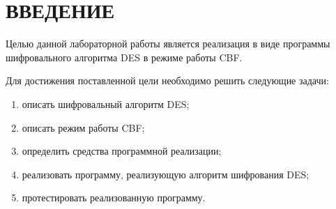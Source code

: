 \chapter*{ВВЕДЕНИЕ}

Целью данной лабораторной работы является реализация в виде программы шифровального алгоритма DES в режиме работы CBF.

Для достижения поставленной цели необходимо решить следующие задачи:
\begin{enumerate}
	\item описать шифровальный алгоритм DES;
	\item описать режим работы CBF;
	\item определить средства программной реализации;
	\item реализовать программу, реализующую алгоритм шифрования DES;
	\item протестировать реализованную программу.
\end{enumerate}
